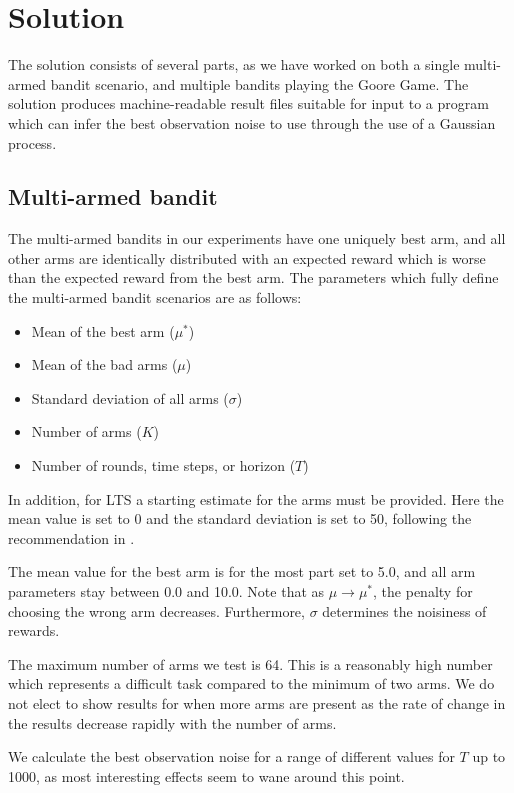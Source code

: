\chapter{Solution}
\label{ch:solution}

The solution consists of several parts, as we have worked on both a single multi-armed bandit scenario, and multiple bandits playing the Goore Game.
The solution produces machine-readable result files suitable for input to a program which can infer the best observation noise to use through the use of a Gaussian process.


\section{Multi-armed bandit}
The multi-armed bandits in our experiments have one uniquely best arm, and all other arms are identically distributed with an expected reward which is worse than the expected reward from the best arm.
The parameters which fully define the multi-armed bandit scenarios are as follows:
\begin{itemize}
    \item Mean of the best arm ($\mu^*$)
    \item Mean of the bad arms ($\mu$)
    \item Standard deviation of all arms ($\sigma$)
    \item Number of arms ($K$)
    \item Number of rounds, time steps, or horizon ($T$)
\end{itemize}

In addition, for LTS a starting estimate for the arms must be provided.
Here the mean value is set to 0 and the standard deviation is set to 50, following the recommendation in \cite{Glimsdal12}.

The mean value for the best arm is for the most part set to 5.0, and all arm parameters stay between 0.0 and 10.0.
Note that as $\mu \to \mu^*$, the penalty for choosing the wrong arm decreases.
Furthermore, $\sigma$ determines the noisiness of rewards.

The maximum number of arms we test is 64.
This is a reasonably high number which represents a difficult task compared to the minimum of two arms.
We do not elect to show results for when more arms are present as the rate of change in the results decrease rapidly with the number of arms.

We calculate the best observation noise for a range of different values for $T$ up to 1000, as most interesting effects seem to wane around this point.

